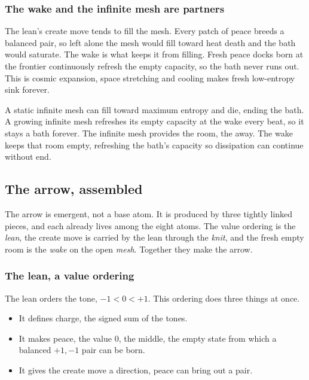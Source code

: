 \subsubsection{The wake and the infinite mesh are partners}

The lean's create move tends to fill the mesh. Every patch of peace breeds a balanced pair, so left alone the mesh would fill toward heat death and the bath would saturate. The wake is what keeps it from filling. Fresh peace docks born at the frontier continuously refresh the empty capacity, so the bath never runs out. This is cosmic expansion, space stretching and cooling makes fresh low-entropy sink forever.

\begin{result}
A static infinite mesh can fill toward maximum entropy and die, ending the bath. A growing infinite mesh refreshes its empty capacity at the wake every beat, so it stays a bath forever. The infinite mesh provides the room, the away. The wake keeps that room empty, refreshing the bath's capacity so dissipation can continue without end.
\end{result}

\subsection{The arrow, assembled}

The arrow is emergent, not a base atom. It is produced by three tightly linked pieces, and each already lives among the eight atoms. The value ordering is the \emph{lean}, the create move is carried by the lean through the \emph{knit}, and the fresh empty room is the \emph{wake} on the open \emph{mesh}. Together they make the arrow.

\subsubsection{The lean, a value ordering}

The lean orders the tone, $-1 < 0 < +1$. This ordering does three things at once.

\begin{itemize}
\item It defines charge, the signed sum of the tones.
\item It makes peace, the value $0$, the middle, the empty state from which a balanced $+1, -1$ pair can be born.
\item It gives the create move a direction, peace can bring out a pair.
\end{itemize}

